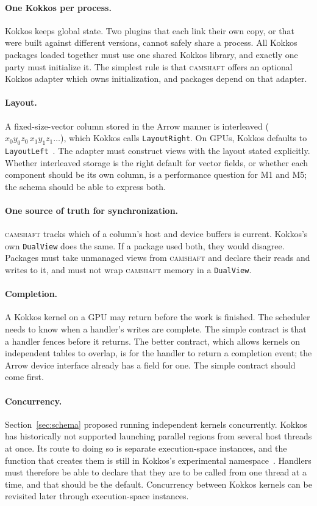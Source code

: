 \documentclass[11pt,a4paper]{article}
\newcommand{\camshaft}{\textsc{camshaft}}
\newcommand{\code}[1]{\texttt{#1}}
\begin{document}
\paragraph{One Kokkos per process.}  Kokkos keeps global state.  Two plugins
that each link their own copy, or that were built against different versions,
cannot safely share a process.  All Kokkos packages loaded together must use
one shared Kokkos library, and exactly one party must initialize it.  The
simplest rule is that \camshaft{} offers an optional Kokkos adapter which owns
initialization, and packages depend on that adapter.

\paragraph{Layout.}  A fixed-size-vector column stored in the Arrow manner is
interleaved ($x_0 y_0 z_0\, x_1 y_1 z_1 \ldots$), which Kokkos calls
\code{LayoutRight}.  On GPUs, Kokkos defaults to
\code{LayoutLeft}~\cite{kokkosdocs}.  The
adapter must construct views with the layout stated explicitly.  Whether
interleaved storage is the right default for vector fields, or whether each
component should be its own column, is a performance question for M1 and M5;
the schema should be able to express both.

\paragraph{One source of truth for synchronization.}  \camshaft{} tracks which of
a column's host and device buffers is current.  Kokkos's own
\code{DualView} does the same.  If a package used both, they would disagree.
Packages must take unmanaged views from \camshaft{} and declare their reads and
writes to it, and must not wrap \camshaft{} memory in a \code{DualView}.

\paragraph{Completion.}  A Kokkos kernel on a GPU may return before the work
is finished.  The scheduler needs to know when a handler's writes are
complete.  The simple contract is that a handler fences before it returns.
The better contract, which allows kernels on independent tables to overlap,
is for the handler to return a completion event; the Arrow device interface
already has a field for one.  The simple contract should come first.

\paragraph{Concurrency.}  Section~\ref{sec:schema} proposed running
independent kernels concurrently.  Kokkos has historically not supported
launching parallel regions from several host threads at once.  Its route to
doing so is separate execution-space instances, and the function that
creates them is still in Kokkos's experimental
namespace~\cite{kokkosdocs}.  Handlers must
therefore be able to declare that they are to be called from one thread at a
time, and that should be the default.  Concurrency between Kokkos kernels can
be revisited later through execution-space instances.
\end{document}
